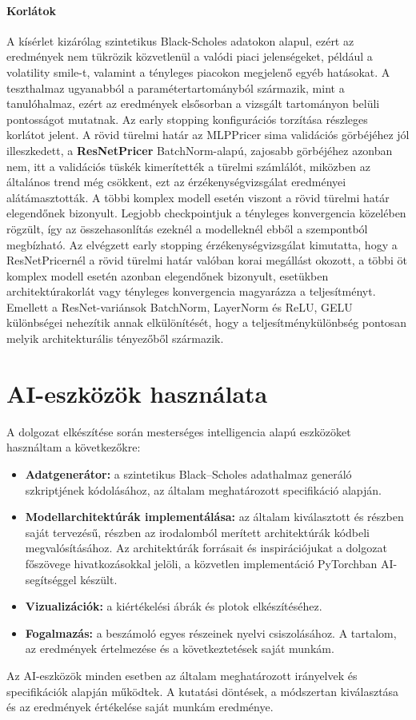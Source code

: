 \paragraph{Korlátok}
A kísérlet kizárólag szintetikus Black-Scholes adatokon alapul, ezért az eredmények nem tükrözik közvetlenül a valódi piaci jelenségeket, például a volatility smile-t, valamint a tényleges piacokon megjelenő egyéb hatásokat. A teszthalmaz ugyanabból a paramétertartományból származik, mint a tanulóhalmaz, ezért az eredmények elsősorban a vizsgált tartományon belüli pontosságot mutatnak. Az early stopping konfigurációs torzítása részleges korlátot jelent. A rövid türelmi határ az MLPPricer sima validációs görbéjéhez jól illeszkedett, a \textbf{ResNetPricer} BatchNorm-alapú, zajosabb görbéjéhez azonban nem, itt a validációs tüskék kimerítették a türelmi számlálót, miközben az általános trend még csökkent, ezt az érzékenységvizsgálat eredményei alátámasztották. A többi komplex modell esetén viszont a rövid türelmi határ elegendőnek bizonyult. Legjobb checkpointjuk a tényleges konvergencia közelében rögzült, így az összehasonlítás ezeknél a modelleknél ebből a szempontból megbízható. Az elvégzett early stopping érzékenységvizsgálat kimutatta, hogy a ResNetPricernél a rövid türelmi határ valóban korai megállást okozott, a többi öt komplex modell esetén azonban elegendőnek bizonyult, esetükben architektúrakorlát vagy tényleges konvergencia magyarázza a teljesítményt. Emellett a ResNet-variánsok BatchNorm, LayerNorm és ReLU, GELU különbségei nehezítik annak elkülönítését, hogy a teljesítménykülönbség pontosan melyik architekturális tényezőből származik.

\section*{AI-eszközök használata}

A dolgozat elkészítése során mesterséges intelligencia alapú eszközöket használtam a következőkre:

\begin{itemize}
    \item \textbf{Adatgenerátor:} a szintetikus Black–Scholes adathalmaz generáló szkriptjének kódolásához, az általam meghatározott specifikáció alapján.
    \item \textbf{Modellarchitektúrák implementálása:} az általam kiválasztott és részben saját tervezésű, részben az irodalomból merített architektúrák kódbeli megvalósításához. Az architektúrák forrásait és inspirációjukat a dolgozat főszövege hivatkozásokkal jelöli, a közvetlen implementáció PyTorchban AI-segítséggel készült.
    \item \textbf{Vizualizációk:} a kiértékelési ábrák és plotok elkészítéséhez.
    \item \textbf{Fogalmazás:} a beszámoló egyes részeinek nyelvi csiszolásához. A tartalom, az eredmények értelmezése és a következtetések saját munkám.
\end{itemize}

Az AI-eszközök minden esetben az általam meghatározott irányelvek és specifikációk alapján működtek. A kutatási döntések, a módszertan kiválasztása és az eredmények értékelése saját munkám eredménye.
